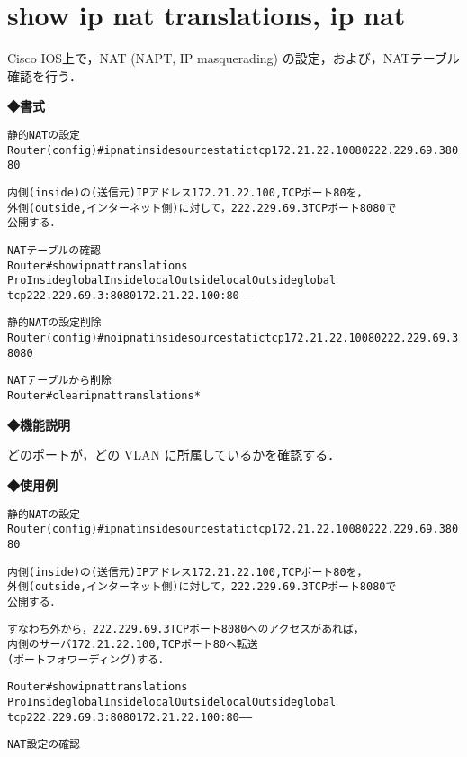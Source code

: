 \section{show ip nat translations, ip nat}
\label{cmd:ios-show-int-status-nat}
Cisco IOS上で，NAT (NAPT, IP masquerading) の設定，および，NATテーブル確認を行う．

\noindent
{\bf ◆書式}
\begin{center}
\begin{screen}
\begin{alltt}
静的 NAT の設定
Router(config)#ip nat inside source static tcp 172.21.22.100 80 222.229.69.3 8080

内側(inside) の(送信元)IPアドレス 172.21.22.100, TCP ポート 80 を，
外側(outside, インターネット側) に対して，222.229.69.3 TCP ポート 8080 で
公開する．

NATテーブルの確認
Router#show ip nat translations
Pro Inside global         Inside local          Outside local         Outside global
tcp 222.229.69.3:8080     172.21.22.100:80      ---                   ---

静的 NAT の設定削除
Router(config)#no ip nat inside source static tcp 172.21.22.100 80 222.229.69.3 8080

NATテーブルから削除
Router#clear ip nat translations *

\end{alltt}
\end{screen}
\end{center}


{\bf ◆機能説明}

どのポートが，どの VLAN に所属しているかを確認する．

{\bf ◆使用例}
\begin{center}
\begin{breakbox}
\begin{alltt}
静的 NAT の設定
Router(config)#ip nat inside source static tcp 172.21.22.100 80 222.229.69.3 8080

内側(inside) の(送信元)IPアドレス 172.21.22.100, TCP ポート 80 を，
外側(outside, インターネット側) に対して，222.229.69.3 TCP ポート 8080 で
公開する．

すなわち外から，222.229.69.3 TCP ポート 8080 へのアクセスがあれば，
内側のサーバ 172.21.22.100, TCP ポート 80 へ転送
(ポートフォワーディング)する．

Router#show ip nat translations
Pro Inside global         Inside local          Outside local         Outside global
tcp 222.229.69.3:8080     172.21.22.100:80      ---                   ---

NAT 設定の確認
\end{alltt}
\end{breakbox}
\end{center}
                

